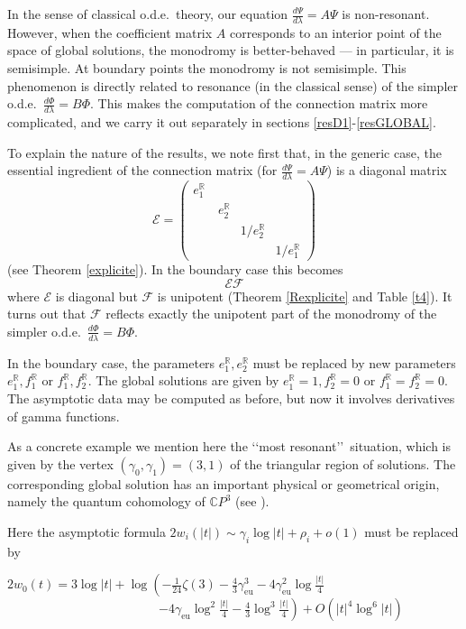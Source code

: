 \documentclass[a4paper,12pt,leqno]{amsart}
\numberwithin{equation}{section}
\theoremstyle{plain}
\theoremstyle{definition}
\newcommand{\C}{\mathbb C}
\newcommand{\R}{\mathbb R}
\newcommand{\ga}{\gamma}
\newcommand{\la}{\lambda}
\newcommand{\no}{\noindent}
\renewcommand{\ll}{\lq\lq}
\newcommand{\rr}{\rq\rq\ }
\newcommand{\bp}{\begin{pmatrix}}
\newcommand{\ep}{\end{pmatrix}}
\newcommand{\euler}{\gamma_{\scriptscriptstyle\text{eu}}}
\begin{document}
\no{\em Resonance.}

In the sense of classical o.d.e.\ theory, our equation $\frac{d\Psi}{d\la}=A\Psi$ is non-resonant.  However, when the coefficient matrix $A$ corresponds to an interior point of the space of global solutions, the monodromy is better-behaved --- in particular, it is semisimple.  At boundary points the monodromy is not semisimple. This phenomenon is directly related to resonance (in the classical sense) of the simpler o.d.e.\ $\frac{d\Phi}{d\la}=B\Phi$. This makes the computation of the connection matrix more complicated, and 
we carry it out separately in sections \ref{resD1}-\ref{resGLOBAL}.  

To explain the nature of the results, we note first that, in the generic case, the essential ingredient of the connection matrix (for $\frac{d\Psi}{d\la}=A\Psi$) is a diagonal matrix
\[
\mathcal E = 
\bp
e^\R_1\   & & & \\
  &e^\R_2 & & \\
  & & 1/e^\R_2& \\
  & & & 1/e^\R_1
  \ep
\]
(see Theorem \ref{explicite}).  In the boundary case this becomes
\[
\mathcal E \mathcal F
\]
where $\mathcal E$ is diagonal but $\mathcal F$ is unipotent
(Theorem \ref{Rexplicite} and Table \ref{t4}).  It turns out that $\mathcal F$ reflects exactly the unipotent part of the monodromy of the simpler o.d.e.\ $\frac{d\Phi}{d\la}=B\Phi$.

In the boundary case, the parameters $e_1^\R,e_2^\R$ must be replaced by new parameters $e_1^\R,f_1^\R$ or $f_1^\R,f_2^\R$.  The global solutions are given by $e_1^\R=1,f_2^\R=0$ or $f_1^\R=f_2^\R=0$.  The asymptotic data may be computed as before, but now it involves derivatives of gamma functions.   

As a concrete example we mention here the \ll most resonant\rr situation, which is given by the vertex $(\gamma_0,\gamma_1)=(3,1)$ of the triangular region of solutions.  The corresponding global solution has an important physical or geometrical origin, namely the quantum cohomology of $\C P^3$ (see \cite{GuLi12,GuLi14}). 

Here the asymptotic formula $2w_i(\vert t\vert)\sim\ga_i\log\vert t\vert + \rho_i+o(1)$ must be replaced by

\no
$
2w_0(t)=  3\log\vert t\vert + \log  
\left(
-\tfrac1{24}\zeta(3)-\tfrac43\euler^3
-4\euler^2\log\tfrac{\vert t\vert}{4}
\right.
$
\newline
$
\quad\quad\quad\quad\quad\quad\quad\quad\quad
\quad\quad\quad
\left.
-4\euler\log^2\tfrac{\vert t\vert}{4}
-\tfrac43
\log^3\tfrac{\vert t\vert}{4}
\right)
+O(\vert t\vert^4 \log^6\vert t\vert)
$
\end{document}
